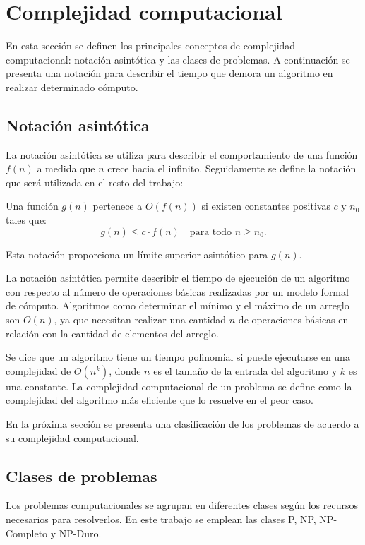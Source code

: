 \section{Complejidad computacional}

En esta sección se definen los principales conceptos de complejidad computacional: notación asintótica y las clases de problemas. A continuación se presenta una notación para describir el tiempo que demora un algoritmo en realizar determinado cómputo.

\subsection{Notación asintótica}

La notación asintótica se utiliza para describir el comportamiento de una función $f(n)$ a medida que $n$ crece hacia el infinito.  Seguidamente se define la notación que será utilizada en el resto del trabajo:

\begin{definition}
  Una función $g(n)$ pertenece a $O(f(n))$ si existen constantes positivas $c$ y $n_0$ tales que:
  \[
    g(n) \leq c \cdot f(n) \quad \text{para todo } n \geq n_0.
  \]
\end{definition}

Esta notación proporciona un límite superior asintótico para $g(n)$.

La notación asintótica permite describir el tiempo de ejecución de un algoritmo con respecto al número de 
operaciones básicas realizadas por un modelo formal de cómputo.  Algoritmos como determinar el mínimo y el 
máximo de un arreglo son $O(n)$, ya que necesitan realizar una cantidad $n$ de operaciones básicas en relación
con la cantidad de elementos del arreglo.

Se dice que un algoritmo tiene un tiempo polinomial si puede ejecutarse en una complejidad de $O(n^k)$, donde $n$ es el tamaño de la entrada del algoritmo y $k$
es una constante. La complejidad computacional de un problema se define como la complejidad del algoritmo más eficiente que lo resuelve en el peor caso.


En la próxima sección se presenta una clasificación de los problemas de acuerdo a su complejidad computacional.
\subsection{Clases de problemas}
\label{sec:problemsCategory}

Los problemas computacionales \cite{authomataTheory} se agrupan en diferentes clases según los recursos 
necesarios para resolverlos. En este trabajo se emplean las clases P, NP, NP-Completo y NP-Duro.

